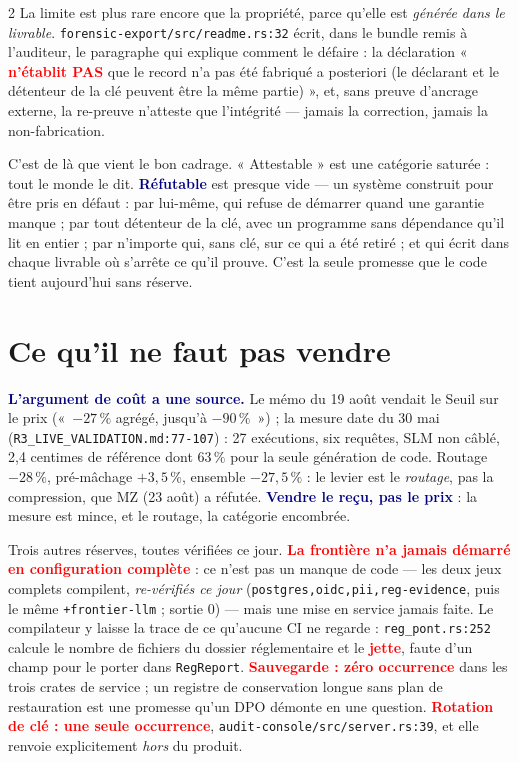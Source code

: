 \documentclass[9pt]{extarticle}
\newcommand{\code}[1]{\texttt{\footnotesize #1}}
\newcommand{\mm}[1]{\textbf{\textcolor{navy}{#1}}}
\newcommand{\ko}[1]{\textcolor{red}{\textbf{#1}}}
\begin{document}
\begin{multicols}{2}
La limite est plus rare encore que la propriété, parce qu'elle est \emph{générée dans le livrable}. \code{forensic-export/src/readme.rs:32} écrit, dans le bundle remis à l'auditeur, le paragraphe qui explique comment le défaire : la déclaration « \ko{n'établit PAS} que le record n'a pas été fabriqué a posteriori (le déclarant et le détenteur de la clé peuvent être la même partie) », et, sans preuve d'ancrage externe, la re-preuve n'atteste que l'intégrité — jamais la correction, jamais la non-fabrication.

C'est de là que vient le bon cadrage. « Attestable » est une catégorie saturée : tout le monde le dit. \mm{Réfutable} est presque vide — un système construit pour être pris en défaut : par lui-même, qui refuse de démarrer quand une garantie manque ; par tout détenteur de la clé, avec un programme sans dépendance qu'il lit en entier ; par n'importe qui, sans clé, sur ce qui a été retiré ; et qui écrit dans chaque livrable où s'arrête ce qu'il prouve. C'est la seule promesse que le code tient aujourd'hui sans réserve.

\section{Ce qu'il ne faut pas vendre}
\begin{alerte}
\mm{L'argument de coût a une source.} Le mémo du 19 août vendait le Seuil sur le prix («~$-27\,\%$ agrégé, jusqu'à $-90\,\%$~») ; la mesure date du 30 mai (\code{R3\_LIVE\_VALIDATION.md:77-107}) : 27 exécutions, six requêtes, SLM non câblé, 2,4 centimes de référence dont $63\,\%$ pour la seule génération de code. Routage $-28\,\%$, pré-mâchage $+3{,}5\,\%$, ensemble $-27{,}5\,\%$ : le levier est le \emph{routage}, pas la compression, que MZ (23 août) a réfutée. \mm{Vendre le reçu, pas le prix} : la mesure est mince, et le routage, la catégorie encombrée.
\end{alerte}
Trois autres réserves, toutes vérifiées ce jour. \ko{La frontière n'a jamais démarré en configuration complète} : ce n'est pas un manque de code — les deux jeux complets compilent, \emph{re-vérifiés ce jour} (\code{postgres,oidc,pii,reg-evidence}, puis le même \code{+frontier-llm} ; sortie 0) — mais une mise en service jamais faite. Le compilateur y laisse la trace de ce qu'aucune CI ne regarde : \code{reg\_pont.rs:252} calcule le nombre de fichiers du dossier réglementaire et le \ko{jette}, faute d'un champ pour le porter dans \code{RegReport}. \ko{Sauvegarde : zéro occurrence} dans les trois crates de service ; un registre de conservation longue sans plan de restauration est une promesse qu'un DPO démonte en une question. \ko{Rotation de clé : une seule occurrence}, \code{audit-console/src/server.rs:39}, et elle renvoie explicitement \emph{hors} du produit.


\end{multicols}
\end{document}
